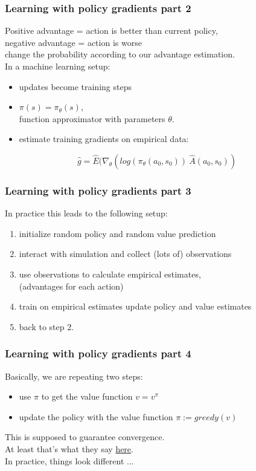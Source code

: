 \documentclass{beamer}
\begin{document}
\begin{frame}
\frametitle{Learning with policy gradients part 2}
Positive advantage = action is better than current policy,\\
negative advantage = action is worse\\
\hspace{0.3cm} \textrightarrow  \hspace{0.3cm} change the probability according to our advantage estimation.\\
\bigskip
In a machine learning setup:
\begin{itemize}
    \item updates become training steps
    \item \(\pi(s) = \pi_\theta(s)\), \\
        function approximator with parameters \(\theta\).
    \item estimate training gradients on empirical data:
\end{itemize}
\bigskip
\begin{large}
\[\hat{g}= \hat{E}(\nabla_\theta (log(\pi_\theta(a_0, s_0)) \: \hat{A}(a_0, s_0))\]
\end{large}
\end{frame}

\begin{frame}
\frametitle{Learning with policy gradients part 3}
In practice this leads to the following setup:
\begin{enumerate}
\item initialize random policy and random value prediction
\item interact with simulation and collect (lots of) observations
\item use observations to calculate empirical estimates,\\
      (advantages for each action)
\item train on empirical estimates \textrightarrow \hspace{0.2cm} update policy and value estimates
\item back to step 2.
\end{enumerate}
\end{frame}


\begin{frame}
\frametitle{Learning with policy gradients part 4}
Basically, we are repeating two steps:
\begin{itemize}
    \item use $\pi$ to get the value function $ v = v^\pi$
    \item update the policy with the value function $\pi := greedy(v)$
\end{itemize}
\bigskip
This is supposed to guarantee convergence. \\
At least that's what they say \href{http://www0.cs.ucl.ac.uk/staff/d.silver/web/Teaching_files/DP.pdf}{here}.\\
\bigskip
In practice, things look different ...
\end{frame}
\end{document}
